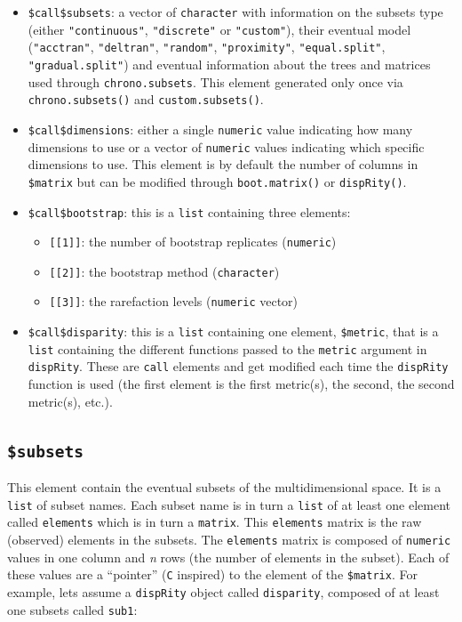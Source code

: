 \documentclass[
]{book}
\providecommand{\tightlist}{%
  \setlength{\itemsep}{0pt}\setlength{\parskip}{0pt}}
\begin{document}
\begin{itemize}
\tightlist
\item
  \texttt{\$call\$subsets}: a vector of \texttt{character} with information on the subsets type (either \texttt{"continuous"}, \texttt{"discrete"} or \texttt{"custom"}), their eventual model (\texttt{"acctran"}, \texttt{"deltran"}, \texttt{"random"}, \texttt{"proximity"}, \texttt{"equal.split"}, \texttt{"gradual.split"}) and eventual information about the trees and matrices used through \texttt{chrono.subsets}. This element generated only once via \texttt{chrono.subsets()} and \texttt{custom.subsets()}.
\item
  \texttt{\$call\$dimensions}: either a single \texttt{numeric} value indicating how many dimensions to use or a vector of \texttt{numeric} values indicating which specific dimensions to use. This element is by default the number of columns in \texttt{\$matrix} but can be modified through \texttt{boot.matrix()} or \texttt{dispRity()}.
\item
  \texttt{\$call\$bootstrap}: this is a \texttt{list} containing three elements:

  \begin{itemize}
  \tightlist
  \item
    \texttt{{[}{[}1{]}{]}}: the number of bootstrap replicates (\texttt{numeric})
  \item
    \texttt{{[}{[}2{]}{]}}: the bootstrap method (\texttt{character})
  \item
    \texttt{{[}{[}3{]}{]}}: the rarefaction levels (\texttt{numeric} vector)
  \end{itemize}
\item
  \texttt{\$call\$disparity}: this is a \texttt{list} containing one element, \texttt{\$metric}, that is a \texttt{list} containing the different functions passed to the \texttt{metric} argument in \texttt{dispRity}. These are \texttt{call} elements and get modified each time the \texttt{dispRity} function is used (the first element is the first metric(s), the second, the second metric(s), etc.).
\end{itemize}

\hypertarget{subsets}{%
\subsection{\texorpdfstring{\texttt{\$subsets}}{\$subsets}}\label{subsets}}

This element contain the eventual subsets of the multidimensional space.
It is a \texttt{list} of subset names.
Each subset name is in turn a \texttt{list} of at least one element called \texttt{elements} which is in turn a \texttt{matrix}.
This \texttt{elements} matrix is the raw (observed) elements in the subsets.
The \texttt{elements} matrix is composed of \texttt{numeric} values in one column and \emph{n} rows (the number of elements in the subset).
Each of these values are a ``pointer'' (\texttt{C} inspired) to the element of the \texttt{\$matrix}.
For example, lets assume a \texttt{dispRity} object called \texttt{disparity}, composed of at least one subsets called \texttt{sub1}:
\end{document}
